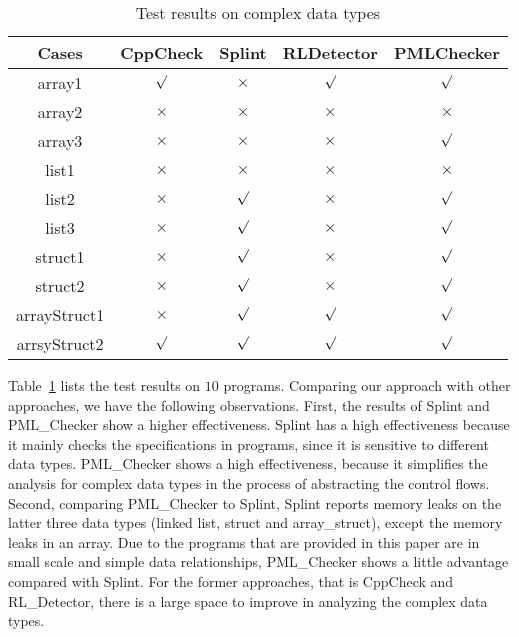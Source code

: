 \begin{table}[!h]
\center
\caption{Test results on complex data types}\label{tab:8}
\begin{tabular}{|c|c|c|c|c|}
\hline
\textbf{Cases}  & \textbf{CppCheck} & \textbf{Splint} & \textbf{RLDetector} & \textbf{PMLChecker}\\
\hline
array1	 &	$\surd$ & $\times$ & $\surd$ & $\surd$\\
\hline
array2  & $\times$ & $\times$ & $\times$ & $\times$ \\
\hline
array3	 & $\times$ &	$\times$ & $\times$ & $\surd$\\
\hline
list1 	& $\times$ &$\times$ & $\times$ & $\times$\\
\hline
list2	 & $\times$ & $\surd$ & $\times$ & $\surd$\\
\hline
list3	 &	$\times$	& $\surd$ & $\times$ & $\surd$\\
\hline
struct1	 & $\times$ & $\surd$ & $\times$ & $\surd$\\
\hline
struct2	 & $\times$ & $\surd$ & $\times$ & $\surd$\\
\hline
arrayStruct1	 & $\times$ & $\surd$ & $\surd$ & $\surd$\\
\hline
arrsyStruct2  & $\surd$ & $\surd$ & $\surd$& $\surd$\\
\hline
\end{tabular}
\end{table}


Table~\ref{tab:8} lists the test results on $10$ programs. Comparing our approach with other approaches, we have the following observations.
First, %
the results of Splint and PML\_Checker show a higher effectiveness. Splint has a high effectiveness because it mainly checks the specifications in programs, since it is sensitive to different data types. PML\_Checker shows a high effectiveness, because it simplifies the analysis for complex data types in the process of abstracting the control flows.
Second, comparing PML\_Checker to Splint, Splint reports memory leaks on the latter three data types (linked list, struct and array\_struct), except the memory leaks in an array. Due to the programs that are provided in this paper are in small scale and simple data relationships, PML\_Checker shows a little advantage compared with Splint. For the former approaches, that is CppCheck and RL\_Detector, there is a large space to improve in analyzing the complex data types.

